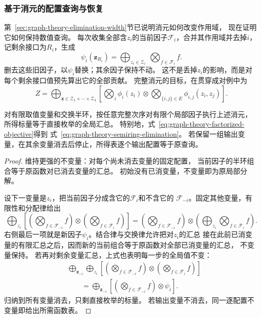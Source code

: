 \subsubsection{基于消元的配置查询与恢复}

第~\ref{sec:graph-theory-elimination-width}节已说明消元如何改变作用域，
现在证明它如何保持数值查询。
每次收集全部含\(z_i\)的当前因子\(\mathcal F_i\)，合并其作用域并去掉\(i\)，
记剩余接口为\(R_i\)，生成
\[
  \psi_i(\bm z_{R_i})
  =\bigoplus_{z_i\in\mathcal Z_i}\ \bigotimes_{f\in\mathcal F_i}f.
\]
删去这些旧因子，以\(\psi_i\)替换；其余因子保持不动。
这不是丢掉\(z_i\)的影响，而是对每个剩余接口值预先算出它的全部贡献。
完整消元的目标，在贯穿成对例中为
\begin{equation}
  Z=\bigoplus_{\bm z\in\mathcal Z_1\times\cdots\times\mathcal Z_4}
  \left[
    \bigotimes_i\phi_i(z_i)
    \otimes\bigotimes_{\{i,j\}\in E}\phi_{i,j}(z_i,z_j)
  \right].
  \label{eq:graph-theory-semiring-elimination}
\end{equation}

\begin{theorem}[半环变量消除的正确性]
  \label{thm:graph-theory-semiring-elimination}
  对有限取值变量和交换半环，按任意完整次序对有限个局部因子执行上述消元，
  所得标量等于直接枚举的全局汇总。
  特别地，式~\eqref{eq:graph-theory-factorized-objective}得到
  式~\eqref{eq:graph-theory-semiring-elimination}。
  若保留一组输出变量，在其余变量消去后停止，所得表逐个输出配置等于原查询。
\end{theorem}

\begin{proof}
维持更强的不变量：对每个尚未消去变量的固定配置，
当前因子的半环组合等于原函数对已消去变量的汇总。
初始没有已消变量，不变量即为原局部分解。

设下一变量是\(z_i\)，把当前因子分成含它的\(\mathcal F_i\)和不含它的
\(\mathcal F_{-i}\)。固定其他变量，有限性和分配律给出
\[
  \bigoplus_{z_i}
  \left[
    \left(\bigotimes_{f\in\mathcal F_{-i}}f\right)
    \otimes\left(\bigotimes_{f\in\mathcal F_i}f\right)
  \right]
  =
  \left(\bigotimes_{f\in\mathcal F_{-i}}f\right)
  \otimes\left(\bigoplus_{z_i}\bigotimes_{f\in\mathcal F_i}f\right).
\]
右侧最后一项就是新因子\(\psi_i\)。结合律与交换律允许把对\(z_i\)的汇总
接在此前已消变量的有限汇总之后，因而新的当前组合等于原函数对全部已消变量的汇总，
不变量保持。
若再对剩余变量汇总，上式也表明每一步的全局值不变：
\begin{align*}
  &\bigoplus_{\bm z_{-i}}\bigoplus_{z_i}
    \left[\left(\bigotimes_{f\in\mathcal F_{-i}}f\right)
       \otimes\left(\bigotimes_{f\in\mathcal F_i}f\right)\right]\\
  &\qquad=\bigoplus_{\bm z_{-i}}
    \left[\left(\bigotimes_{f\in\mathcal F_{-i}}f\right)\otimes\psi_i\right].
\end{align*}
归纳到所有变量消去，只剩直接枚举的标量。
若输出变量不消去，同一逐配置不变量即给出所需函数表。
\end{proof}

